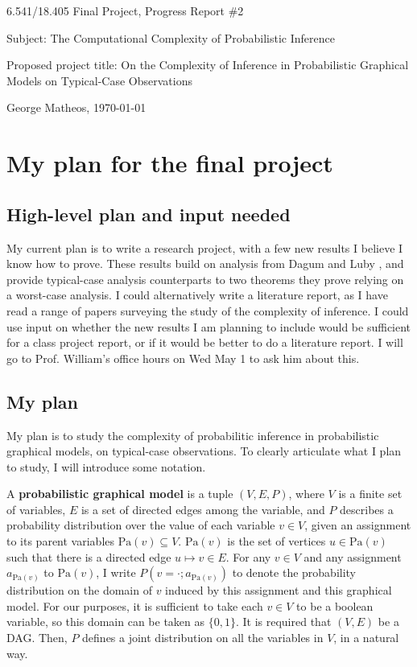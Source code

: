 \documentclass{article}
\def \Pa{\text{Pa}}
\begin{document}
\begin{center}
    \Large
    6.541/18.405 Final Project, Progress Report \#2

    \vspace{3pt}
    Subject: The Computational Complexity of Probabilistic Inference

    \vspace{3pt}
    Proposed project title: On the Complexity of Inference in Probabilistic Graphical Models on Typical-Case Observations

    \vspace{3pt}
    \normalsize
    George Matheos, \today
\end{center}

\section{My plan for the final project}

\subsection{High-level plan and input needed}
My current plan is to write a research project, with a few new results I believe I know how to prove.
These results build on analysis from Dagum and Luby \cite{dagum1993,dagum1997optimal}, and provide typical-case analysis counterparts to two theorems they prove relying on a worst-case analysis.
I could alternatively write a literature report, as I have read a range of papers surveying the study of the complexity of inference.
I could use input on whether the new results I am planning to include would be sufficient for a class project report, or if it would be better to do a literature report.
I will go to Prof. William's office hours on Wed May 1 to ask him about this.

\subsection{My plan}

My plan is to study the complexity of probabilitic inference in probabilistic graphical models, on typical-case observations.
To clearly articulate what I plan to study, I will introduce some notation.

A \textbf{probabilistic graphical model} is a tuple $(V, E, P)$, where $V$ is a finite set of variables, $E$ is a set of directed edges among the variable, and $P$ describes a probability distribution over the value of each variable $v \in V$, given an assignment to its parent variables $\Pa(v) \subseteq V$.  $\Pa(v)$ is the set of vertices $u \in \Pa(v)$ such that there is a directed edge $u \mapsto v \in E$.
For any $v \in V$ and any assignment $a_{\Pa(v)}$ to $\Pa(v)$, I write $P(v = \cdot ; a_{\Pa(v)})$ to denote the probability distribution on the domain of $v$ induced by this assignment and this graphical model.
For our purposes, it is sufficient to take each $v \in V$ to be a boolean variable, so this domain can be taken as $\{0, 1\}$.
It is required that $(V, E)$ be a DAG.
Then, $P$ defines a joint distribution on all the variables in $V$, in a natural way.
\end{document}
